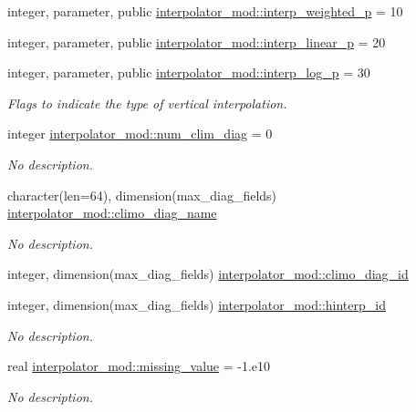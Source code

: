 \begin{DoxyCompactItemize}
integer, parameter, public \hyperlink{namespaceinterpolator__mod_aa0f19074ff527b11830b0efe795e55c2}{interpolator\+\_\+mod\+::interp\+\_\+weighted\+\_\+p} = 10
\item 
integer, parameter, public \hyperlink{namespaceinterpolator__mod_a80a3b9259000c57c6bea011f7fdd8fe2}{interpolator\+\_\+mod\+::interp\+\_\+linear\+\_\+p} = 20
\item 
integer, parameter, public \hyperlink{namespaceinterpolator__mod_a7acb040c71c8d9a10d564444ab9a204b}{interpolator\+\_\+mod\+::interp\+\_\+log\+\_\+p} = 30
\begin{DoxyCompactList}\small\item\em Flags to indicate the type of vertical interpolation. \end{DoxyCompactList}\item 
integer \hyperlink{namespaceinterpolator__mod_ad8083acb68a1b01f066355895089068d}{interpolator\+\_\+mod\+::num\+\_\+clim\+\_\+diag} = 0
\begin{DoxyCompactList}\small\item\em No description. \end{DoxyCompactList}\item 
character(len=64), dimension(max\+\_\+diag\+\_\+fields) \hyperlink{namespaceinterpolator__mod_aa4a4770d40b28a65a860644479f96981}{interpolator\+\_\+mod\+::climo\+\_\+diag\+\_\+name}
\begin{DoxyCompactList}\small\item\em No description. \end{DoxyCompactList}\item 
integer, dimension(max\+\_\+diag\+\_\+fields) \hyperlink{namespaceinterpolator__mod_a6ca0a0304189407d598752712c9a89c5}{interpolator\+\_\+mod\+::climo\+\_\+diag\+\_\+id}
\item 
integer, dimension(max\+\_\+diag\+\_\+fields) \hyperlink{namespaceinterpolator__mod_a540181c07fce2c581ddf5025038c966c}{interpolator\+\_\+mod\+::hinterp\+\_\+id}
\begin{DoxyCompactList}\small\item\em No description. \end{DoxyCompactList}\item 
real \hyperlink{namespaceinterpolator__mod_ad8078f4ec0772ef91cafcbdbeb84c16c}{interpolator\+\_\+mod\+::missing\+\_\+value} = -\/1.e10
\begin{DoxyCompactList}\small\item\em No description. \end{DoxyCompactList}\item 

\end{DoxyCompactItemize}
